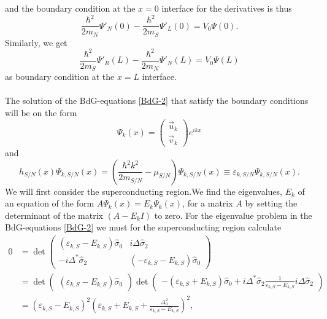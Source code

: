 and the boundary condition at the $x=0$ interface for the derivatives is thus
\begin{equation}
    \frac{\hbar^2}{2m_N} \Psi'_N(0) - \frac{\hbar^2}{2m_S} \Psi'_L(0) = V_0\Psi(0).
\end{equation}
Similarly, we get
\begin{equation}
    \frac{\hbar^2}{2m_S} \Psi'_R(L) - \frac{\hbar^2}{2m_N} \Psi'_N(L) = V_0\Psi(L)
\end{equation}
as boundary condition at the $x=L$ interface.
\\
\\
The solution of the BdG-equations \eqref{BdG-2} that satisfy the boundary conditions will be on the form 
\begin{equation}
    \Psi_{k}(x) = 
    \begin{pmatrix}
    \vec{u}_k \\ \vec{v}_k
    \end{pmatrix}
    e^{ikx}
\end{equation}
and 
\begin{equation}
    h_{S/N}(x)\Psi_{k,S/N}(x) = \left(\frac{\hbar^2k^2}{2m_{S/N}}-\mu_{S/N}\right)\Psi_{k,S/N}(x) \equiv \varepsilon_{k,S/N} \Psi_{k,S/N}(x).
\end{equation}
We will first consider the superconducting region.We find the eigenvalues, $E_k$ of an equation of the form $A\Psi_k(x) = E_k\Psi_k(x)$, for a matrix $A$ by setting the determinant of the matrix $(A-E_kI)$ to zero. For the eigenvalue problem in the BdG-equations \eqref{BdG-2} we must for the superconducting region calculate
\begin{equation}
\begin{split}
    0 &= 
    \det\begin{pmatrix}
        \left(\varepsilon_{k,S} - E_{k,S}\right)\hat{\sigma}_0 & i\Delta\hat{\sigma}_2 \\
        -i\Delta^*\hat{\sigma}_2 & \left(-\varepsilon_{k,S} - E_{k,S}\right)\hat{\sigma}_0
    \end{pmatrix}
    \\ &= 
    \det\begin{pmatrix}(\varepsilon_{k,S} -E_{k,S})\hat{\sigma}_0\end{pmatrix}
    \det\begin{pmatrix}
    -(\varepsilon_{k,S} + E_{k,S})\hat{\sigma}_0 + i\Delta^*\hat{\sigma}_2\frac{1}{\varepsilon_{k,S}-E_{k,S}}i\Delta\hat{\sigma}_2
    \end{pmatrix}
    \\&=
    \left(\varepsilon_{k,S}-E_{k,S}\right)^2\left(\varepsilon_{k,S} + E_{k,S} + \frac{\Delta_0^2}{\varepsilon_{k,S} - E_{k,S}}\right)^2,
\end{split}
\label{det}
\end{equation}
